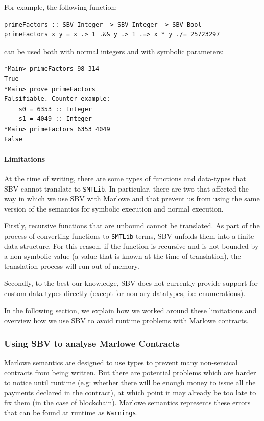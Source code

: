 \documentclass[runningheads]{llncs}
\begin{document}
For example, the following function:

\begin{verbatim}
primeFactors :: SBV Integer -> SBV Integer -> SBV Bool
primeFactors x y = x .> 1 .&& y .> 1 .=> x * y ./= 25723297
\end{verbatim}

can be used both with normal integers and with symbolic parameters:

\begin{verbatim}
*Main> primeFactors 98 314
True
*Main> prove primeFactors
Falsifiable. Counter-example:
    s0 = 6353 :: Integer
    s1 = 4049 :: Integer
*Main> primeFactors 6353 4049
False
\end{verbatim}

\paragraph{Limitations}

At the time of writing, there are some types of functions and data-types that SBV cannot translate to \texttt{SMTLib}. In particular, there are two that affected the way in which we use SBV with Marlowe and that prevent us from using the same version of the semantics for symbolic execution and normal execution.

Firstly, recursive functions that are unbound cannot be translated. As part of the process of converting functions to \texttt{SMTLib} terms, SBV unfolds them into a finite data-structure. For this reason, if the function is recursive and is not bounded by a non-symbolic value (a value that is known at the time of translation), the translation process will run out of memory.

Secondly, to the best our knowledge, SBV does not currently provide support for custom data types directly (except for non-ary datatypes, i.e: enumerations).

In the following section, we explain how we worked around these limitations and overview how we use SBV to avoid runtime problems with Marlowe contracts.

\subsubsection{Using SBV to analyse Marlowe Contracts}

Marlowe semantics are designed to use types to prevent many non-sensical contracts from being written. But there are potential problems which are harder to notice until runtime (e.g: whether there will be enough money to issue all the payments declared in the contract), at which point it may already be too late to fix them (in the case of blockchain). Marlowe semantics represents these errors that can be found at runtime as \texttt{Warnings}.
\end{document}
